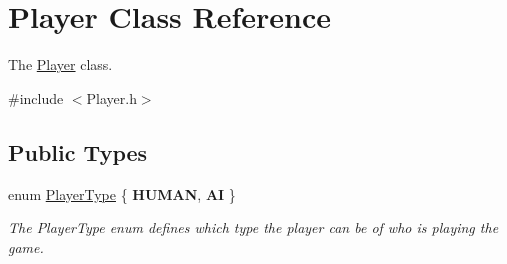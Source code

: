 \hypertarget{classPlayer}{\section{Player Class Reference}
\label{classPlayer}
}


The \hyperlink{classPlayer}{Player} class.  




{\ttfamily \#include $<$Player.\-h$>$}

\subsection*{Public Types}
\begin{DoxyCompactItemize}
\item 
enum \hyperlink{classPlayer_a97dc3c423902370176605121e8f68415}{Player\-Type} \{ {\bfseries H\-U\-M\-A\-N}, 
{\bfseries A\-I}
 \}
\begin{DoxyCompactList}\small\item\em The Player\-Type enum defines which type the player can be of who is playing the game. \end{DoxyCompactList}\end{DoxyCompactItemize}
